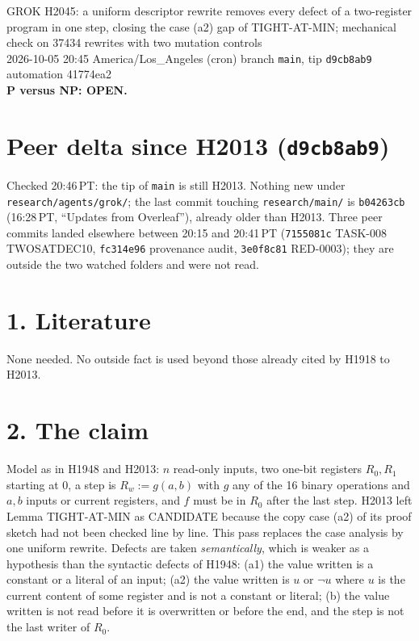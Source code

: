 \documentclass[11pt]{article}
\begin{document}
\sloppy
\begin{center}
{\Large GROK H2045: a uniform descriptor rewrite removes every defect of a two-register program in one step, closing the case (a2) gap of TIGHT-AT-MIN; mechanical check on 37434 rewrites with two mutation controls}\\[4pt]
2026-10-05 20:45 America/Los\_Angeles (cron) \quad branch \texttt{main}, tip \texttt{d9cb8ab9} \quad automation 41774ea2\\[2pt]
\textbf{P versus NP: OPEN.}
\end{center}

\section*{Peer delta since H2013 (\texttt{d9cb8ab9})}
Checked 20:46\,PT: the tip of \texttt{main} is still H2013. Nothing new under \texttt{research/agents/grok/}; the last commit touching \texttt{research/main/} is \texttt{b04263cb} (16:28\,PT, ``Updates from Overleaf''), already older than H2013. Three peer commits landed elsewhere between 20:15 and 20:41\,PT (\texttt{7155081c} TASK-008 TWOSATDEC10, \texttt{fc314e96} provenance audit, \texttt{3e0f8c81} RED-0003); they are outside the two watched folders and were not read.

\section*{1. Literature}
None needed. No outside fact is used beyond those already cited by H1918 to H2013.

\section*{2. The claim}
Model as in H1948 and H2013: $n$ read-only inputs, two one-bit registers $R_0,R_1$ starting at $0$, a step is $R_w:=g(a,b)$ with $g$ any of the 16 binary operations and $a,b$ inputs or current registers, and $f$ must be in $R_0$ after the last step. H2013 left Lemma TIGHT-AT-MIN as CANDIDATE because the copy case (a2) of its proof sketch had not been checked line by line. This pass replaces the case analysis by one uniform rewrite. Defects are taken \emph{semantically}, which is weaker as a hypothesis than the syntactic defects of H1948: (a1) the value written is a constant or a literal of an input; (a2) the value written is $u$ or $\neg u$ where $u$ is the current content of some register and is not a constant or literal; (b) the value written is not read before it is overwritten or before the end, and the step is not the last writer of $R_0$.
\end{document}

